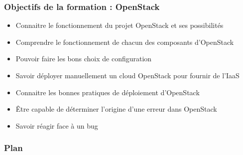   \begin{frame}
    \frametitle{Objectifs de la formation : OpenStack}
    \begin{itemize}
      \item Connaitre le fonctionnement du projet OpenStack et ses possibilités
      \item Comprendre le fonctionnement de chacun des composants d'OpenStack
      \item Pouvoir faire les bons choix de configuration
      \item Savoir déployer manuellement un cloud OpenStack pour fournir de l'IaaS
      \item Connaitre les bonnes pratiques de déploiement d'OpenStack
      \item Être capable de déterminer l'origine d'une erreur dans OpenStack
      \item Savoir réagir face à un bug
    \end{itemize}
  \end{frame}

\begin{comment}
  \begin{frame}
    \frametitle{Pré-requis de la formation}
    \begin{itemize}
      \item Compétences d'administration système Linux tel qu'Ubuntu
      \begin{itemize}
        \item Gestion des paquets
        \item LVM et systèmes de fichiers
      \end{itemize}
      \item Notions de virtualisation, KVM et libvirt
      \item Peut servir :
      \begin{itemize}
        \item À l'aise dans un environnement Python
      \end{itemize}
    \end{itemize}
  \end{frame}
\end{comment}

  \begin{frame}
    \frametitle{Plan}
    \tableofcontents[hideallsubsections]
  \end{frame}
